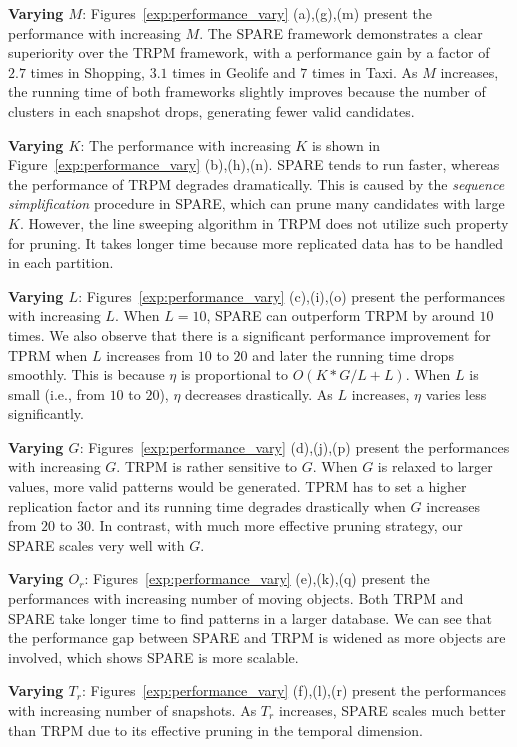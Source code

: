\textbf{Varying $M$}: Figures~\ref{exp:performance_vary} (a),(g),(m)
present the performance with increasing $M$. The SPARE framework demonstrates a clear superiority over the TRPM framework, with 
a performance gain by a factor of  $2.7$ times in Shopping, $3.1$ times in Geolife and
$7$ times in Taxi. As $M$ increases, the running time of both frameworks slightly improves because the number of clusters in each snapshot drops, generating fewer valid candidates.

\textbf{Varying $K$}: The performance with increasing $K$ is shown in Figure~\ref{exp:performance_vary} (b),(h),(n).  SPARE tends to run faster, whereas the performance of TRPM degrades dramatically. This is caused by the \emph{sequence simplification} procedure in SPARE, which can prune many candidates with large $K$. However, the line sweeping algorithm in TRPM does not utilize such property for pruning. It takes longer time because more replicated data has to be handled in each partition.

\textbf{Varying $L$}: Figures~\ref{exp:performance_vary} (c),(i),(o) present the performances with increasing $L$. When $L=10$, SPARE can outperform TRPM by around $10$ times. We also observe that there is a significant performance improvement for TPRM when $L$ increases from $10$ to $20$ and later the running time drops smoothly. 
This is because $\eta$ is proportional to $O(K*G/L+L)$. When $L$ is small (i.e., from $10$ to $20$),
$\eta$ decreases drastically. As $L$ increases, $\eta$ varies less significantly.

\textbf{Varying $G$}: Figures~\ref{exp:performance_vary} (d),(j),(p) present the performances with increasing $G$.  TRPM is rather sensitive to $G$. When $G$ is relaxed to larger values, more valid patterns would be generated. TPRM has to set a higher replication factor and its running time degrades drastically when $G$ increases from $20$ to $30$. In contrast, with much more effective pruning strategy, our SPARE scales very well with $G$.

\textbf{Varying $O_r$}: Figures~\ref{exp:performance_vary} (e),(k),(q) present 
the performances with increasing number of moving objects. Both TRPM and SPARE take longer time to find patterns in a larger database. We can see that the performance gap between SPARE and TRPM is widened as more objects are involved, which shows SPARE is more scalable.

\textbf{Varying $T_r$}: Figures~\ref{exp:performance_vary} (f),(l),(r) present 
the performances with increasing number of snapshots. As $T_r$ increases, SPARE scales much better than TRPM due to its effective pruning in the temporal dimension. 


